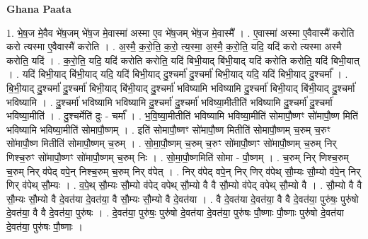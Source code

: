 \documentclass[17pt]{extarticle}
\begin{document}
\textbf{Ghana Paata } \newline

1. भे॒ष॒ज मे॒वैव भे॑ष॒जम् भे॑ष॒ज मे॒वास्मा॑ अस्मा ए॒व भे॑ष॒जम् भे॑ष॒ज मे॒वास्मै᳚ । . ए॒वास्मा॑ अस्मा ए॒वैवास्मै॑ करोति करो त्यस्मा ए॒वैवास्मै॑ करोति । . अ॒स्मै॒ क॒रो॒ति॒ क॒रो॒ त्य॒स्मा॒ अ॒स्मै॒ क॒रो॒ति॒ यदि॒ यदि॑ करो त्यस्मा अस्मै करोति॒ यदि॑ । . क॒रो॒ति॒ यदि॒ यदि॑ करोति करोति॒ यदि॑ बिभी॒याद् बि॑भी॒याद् यदि॑ करोति करोति॒ यदि॑ बिभी॒यात् । . यदि॑ बिभी॒याद् बि॑भी॒याद् यदि॒ यदि॑ बिभी॒याद् दु॒श्चर्मा॑ दु॒श्चर्मा॑ बिभी॒याद् यदि॒ यदि॑ बिभी॒याद् दु॒श्चर्मा᳚ । . बि॒भी॒याद् दु॒श्चर्मा॑ दु॒श्चर्मा॑ बिभी॒याद् बि॑भी॒याद् दु॒श्चर्मा॑ भविष्यामि भविष्यामि दु॒श्चर्मा॑ बिभी॒याद् बि॑भी॒याद् दु॒श्चर्मा॑ भविष्यामि । . दु॒श्चर्मा॑ भविष्यामि भविष्यामि दु॒श्चर्मा॑ दु॒श्चर्मा॑ भविष्या॒मीतीति॑ भविष्यामि दु॒श्चर्मा॑ दु॒श्चर्मा॑ भविष्या॒मीति॑ । . दु॒श्चर्मेति॑ दुः - चर्मा᳚ । . भ॒वि॒ष्या॒मीतीति॑ भविष्यामि भविष्या॒मीति॑ सोमापौ॒ष्णꣳ सो॑मापौ॒ष्ण मिति॑ भविष्यामि भविष्या॒मीति॑ सोमापौ॒ष्णम् । . इति॑ सोमापौ॒ष्णꣳ सो॑मापौ॒ष्ण मितीति॑ सोमापौ॒ष्णम् च॒रुम् च॒रुꣳ सो॑मापौ॒ष्ण मितीति॑ सोमापौ॒ष्णम् च॒रुम् । . सो॒मा॒पौ॒ष्णम् च॒रुम् च॒रुꣳ सो॑मापौ॒ष्णꣳ सो॑मापौ॒ष्णम् च॒रुम् निर् णिश्च॒रुꣳ सो॑मापौ॒ष्णꣳ सो॑मापौ॒ष्णम् च॒रुम् निः । . सो॒मा॒पौ॒ष्णमिति॑ सोमा - पौ॒ष्णम् । . च॒रुम् निर् णिश्च॒रुम् च॒रुम् निर् व॑पेद् वपे॒न् निश्च॒रुम् च॒रुम् निर् व॑पेत् । . निर् व॑पेद् वपे॒न् निर् णिर् व॑पेथ् सौ॒म्यः सौ॒म्यो व॑पे॒न् निर् णिर् व॑पेथ् सौ॒म्यः । . व॒पे॒थ् सौ॒म्यः सौ॒म्यो व॑पेद् वपेथ् सौ॒म्यो वै वै सौ॒म्यो व॑पेद् वपेथ् सौ॒म्यो वै । . सौ॒म्यो वै वै सौ॒म्यः सौ॒म्यो वै दे॒वत॑या दे॒वत॑या॒ वै सौ॒म्यः सौ॒म्यो वै दे॒वत॑या । . वै दे॒वत॑या दे॒वत॑या॒ वै वै दे॒वत॑या॒ पुरु॑षः॒ पुरु॑षो दे॒वत॑या॒ वै वै दे॒वत॑या॒ पुरु॑षः । . दे॒वत॑या॒ पुरु॑षः॒ पुरु॑षो दे॒वत॑या दे॒वत॑या॒ पुरु॑षः पौ॒ष्णाः पौ॒ष्णाः पुरु॑षो दे॒वत॑या दे॒वत॑या॒ पुरु॑षः पौ॒ष्णाः । \newline
\end{document}
